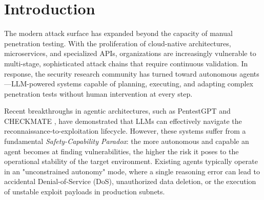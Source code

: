 \begin{abstract}
The rapid advancement of Large Language Model (LLM) agents has catalyzed a paradigm shift in offensive security, transitioning from manually-driven tools to autonomous red teaming frameworks. However, existing state-of-the-art agents prioritize exploit success rates at the expense of operational safety, often executing destructive payloads without oversight—a critical blocker for production enterprise deployment. We present \textbf{CMatrix}, a multi-agent penetration testing orchestration platform that introduces the concept of \textit{Governance-First Autonomy}. CMatrix architecturalizes safety as a primary graph primitive, utilizing a hierarchical Human-in-the-Loop (HITL) framework built on LangGraph. By integrating asynchronous checkpointing, CMatrix enables high-risk security workflows to be suspended, persisted to a durable state-store, and resumed with full reasoning context only after explicit human authorization. Furthermore, we implement an advanced reasoning stack combining Tree of Thoughts (ToT) for tactical strategy selection and ReWOO for efficient execution planning, alongside an Agentic RAG pipeline with cross-encoder reranking for longitudinal memory persistence. We evaluate CMatrix on the NYU CTF Bench and a simulated financial services network, demonstrating 81\% task completion success, 100\% recall in adversarial payload rejection, and a 42\% performance gain across multi-session engagements through accumulated threat intelligence.
\end{abstract}

\section{Introduction}
\label{sec:intro}

The modern attack surface has expanded beyond the capacity of manual penetration testing. With the proliferation of cloud-native architectures, microservices, and specialized APIs, organizations are increasingly vulnerable to multi-stage, sophisticated attack chains that require continuous validation. In response, the security research community has turned toward autonomous agents—LLM-powered systems capable of planning, executing, and adapting complex penetration tests without human intervention at every step.

Recent breakthroughs in agentic architectures, such as PentestGPT \cite{pentestgpt} and CHECKMATE \cite{checkmate2025}, have demonstrated that LLMs can effectively navigate the reconnaissance-to-exploitation lifecycle. However, these systems suffer from a fundamental \textit{Safety-Capability Paradox}: the more autonomous and capable an agent becomes at finding vulnerabilities, the higher the risk it poses to the operational stability of the target environment. Existing agents typically operate in an "unconstrained autonomy" mode, where a single reasoning error can lead to accidental Denial-of-Service (DoS), unauthorized data deletion, or the execution of unstable exploit payloads in production subnets.

